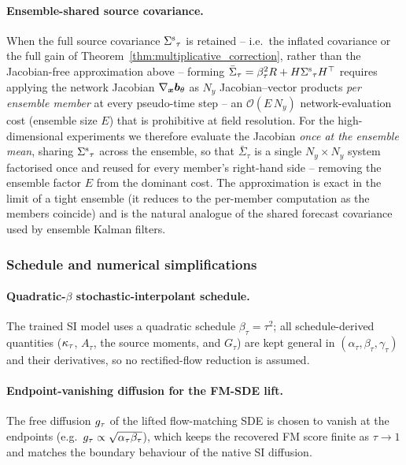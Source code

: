 \paragraph{Ensemble-shared source covariance.}
When the full source covariance ${\Sigma^{\mathrm{s}}}_\tau$ is retained -- i.e.\ the inflated
covariance or the full gain of Theorem~\ref{thm:multiplicative_correction}, rather
than the Jacobian-free approximation above -- forming
$\bar\Sigma_\tau=\beta_\tau^2R+H{\Sigma^{\mathrm{s}}}_\tau H^\top$ requires
applying the network Jacobian $\nabla_{\boldsymbol{x}}\bm{b}_\theta$ as $N_y$ Jacobian--vector
products \emph{per ensemble member} at every pseudo-time step -- an
$\mathcal{O}(E\,N_y)$ network-evaluation cost (ensemble size $E$) that is
prohibitive at field resolution. For the high-dimensional experiments we therefore
evaluate the Jacobian \emph{once at the ensemble mean}, sharing ${\Sigma^{\mathrm{s}}}_\tau$ across
the ensemble, so that $\bar\Sigma_\tau$ is a single $N_y\times N_y$ system factorised
once and reused for every member's right-hand side -- removing the ensemble factor
$E$ from the dominant cost. The approximation is exact in the limit of a tight
ensemble (it reduces to the per-member computation as the members coincide) and is
the natural analogue of the shared forecast covariance used by ensemble Kalman
filters.

\subsubsection{Schedule and numerical simplifications}

\paragraph{Quadratic-$\beta$ stochastic-interpolant schedule.}
The trained SI model uses a quadratic schedule $\beta_\tau=\tau^2$; all
schedule-derived quantities ($\kappa_\tau$, $A_\tau$, the source moments, and
$G_\tau$) are kept general in $(\alpha_\tau,\beta_\tau,\gamma_\tau)$ and their
derivatives, so no rectified-flow reduction is assumed.

\paragraph{Endpoint-vanishing diffusion for the FM-SDE lift.}
The free diffusion $g_\tau$ of the lifted flow-matching SDE is chosen to
vanish at the endpoints (e.g.\ $g_\tau\propto\sqrt{\alpha_\tau\beta_\tau}$),
which keeps the recovered FM score finite as $\tau\to1$ and matches the boundary
behaviour of the native SI diffusion.

